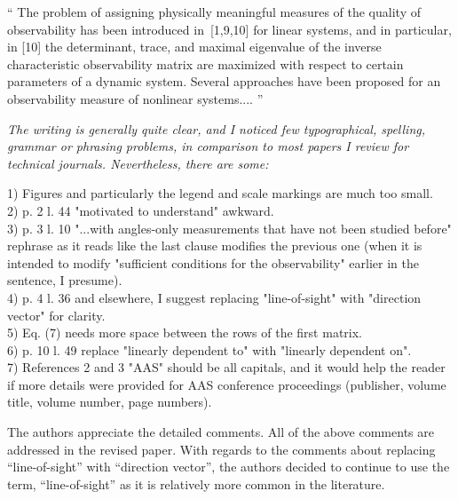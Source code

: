 \documentclass[11pt]{article}
\newenvironment{correction}{\begin{list}{}{\setlength{\leftmargin}{1cm}\setlength{\rightmargin}{1cm}}\vspace{\parsep}\item[]``}{''\end{list}}
\begin{document}
\begin{itemize}
\begin{correction}
%
The problem of assigning physically meaningful measures of the quality of observability has been introduced in~[1,9,10] for linear systems, and in particular, in [10] the determinant, trace, and maximal eigenvalue of the inverse characteristic observability matrix are maximized with respect to certain parameters of a dynamic system. Several approaches have been proposed for an observability measure of nonlinear systems....
\end{correction}





\item    {\itshape The writing is generally quite clear, and I noticed few typographical, spelling, grammar or phrasing problems, in comparison to most papers I review for technical journals. Nevertheless, there are some:
   
   1) Figures and particularly the legend and scale markings are much too small.\\
   2) p. 2 l. 44 "motivated to understand" awkward.\\
   3) p. 3 l. 10 "...with angles-only measurements that have not been studied before" rephrase as it reads like the last clause modifies the previous one (when it is intended to modify "sufficient conditions for the observability" earlier in the sentence, I presume).\\
   4) p. 4 l. 36 and elsewhere, I suggest replacing "line-of-sight" with "direction vector" for clarity.\\
   5) Eq. (7) needs more space between the rows of the first matrix.\\
   6) p. 10 l. 49 replace "linearly dependent to" with "linearly dependent on".\\
   7) References 2 and 3 "AAS" should be all capitals, and it would help the reader if more details were provided for AAS conference proceedings (publisher, volume title, volume number, page numbers).}
   
   
The authors appreciate the detailed comments. All of the above comments are addressed in the revised paper. With regards to the comments about replacing ``line-of-sight'' with ``direction vector'', the authors decided to continue to use the term, ``line-of-sight'' as it is relatively more common in the literature. 






\end{itemize}
\end{document}
